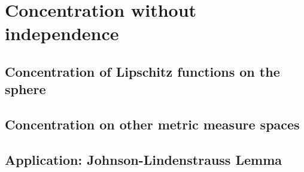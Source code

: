 \chapter{Concentration without independence}
\section{Concentration of Lipschitz functions on the sphere}

\section{Concentration on other metric measure spaces}

\section{Application: Johnson-Lindenstrauss Lemma}